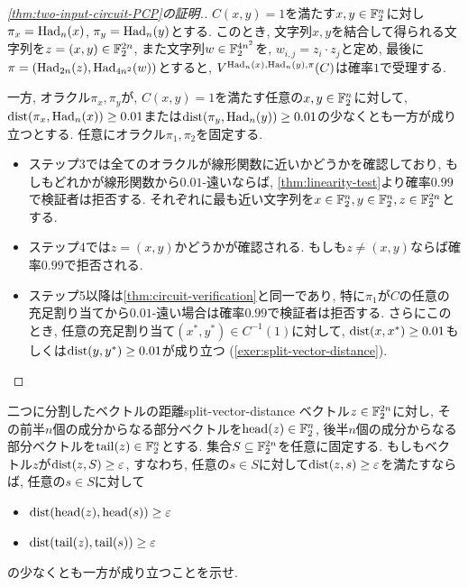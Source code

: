 \begin{proof}[\cref{thm:two-input-circuit-PCP}の証明.]
$C(x,y)=1$を満たす$x,y\in\mathbb{F}_2^n$に対し$\pi_x=\mathrm{Had}_n(x)$, $\pi_y=\mathrm{Had}_n(y)$とする.
このとき, 文字列$x,y$を結合して得られる文字列を$z=(x,y)\in\mathbb{F}_2^{2n}$,
また文字列$w\in\mathbb{F}_2^{4n^2}$を, $w_{i,j}=z_i\cdot z_j$と定め, 最後に
$\pi = \qty( \mathrm{Had}_{2n}(z), \mathrm{Had}_{4n^2}(w) )$とすると,
$V^{\mathrm{Had}_n(x),\mathrm{Had}_n(y),\pi}(C)$は確率$1$で受理する.

一方, オラクル$\pi_x,\pi_y$が, $C(x,y)=1$を満たす任意の$x,y\in\mathbb{F}_2^n$に対して, $\mathrm{dist}(\pi_x,\mathrm{Had}_n(x))\ge 0.01$または$\mathrm{dist}(\pi_y,\mathrm{Had}_n(y))\ge0.01$の少なくとも一方が成り立つとする.
任意にオラクル$\pi_1,\pi_2$を固定する.
\begin{itemize}
  \item ステップ3では全てのオラクルが線形関数に近いかどうかを確認しており, もしもどれかが線形関数から$0.01$-遠いならば, \cref{thm:linearity-test}より確率$0.99$で検証者は拒否する. それぞれに最も近い文字列を$x\in\mathbb{F}_2^n,y\in\mathbb{F}_2^n,z\in\mathbb{F}_2^{2n}$とする.
  \item ステップ4では$z=(x,y)$かどうかが確認される. もしも$z\ne(x,y)$ならば確率$0.99$で拒否される.
  \item ステップ5以降は\cref{thm:circuit-verification}と同一であり, 特に$\pi_1$が$C$の任意の充足割り当てから$0.01$-遠い場合は確率$0.99$で検証者は拒否する. さらにこのとき, 任意の充足割り当て$(x^*,y^*)\in C^{-1}(1)$に対して, $\mathrm{dist}(x,x^*)\ge0.01$もしくは$\mathrm{dist}(y,y^*)\ge 0.01$が成り立つ (\cref{exer:split-vector-distance}).
\end{itemize}
\end{proof}

\begin{exercise}{二つに分割したベクトルの距離}{split-vector-distance}
  ベクトル$z\in\mathbb{F}_2^{2n}$に対し, その前半$n$個の成分からなる部分ベクトルを$\mathrm{head}(z)\in\mathbb{F}_2^n$, 後半$n$個の成分からなる部分ベクトルを$\mathrm{tail}(z)\in\mathbb{F}_2^n$とする.
  集合$S\subseteq\mathbb{F}_2^{2n}$を任意に固定する.
  もしもベクトル$z$が$\mathrm{dist}(z,S)\ge \varepsilon$, すなわち, 任意の$s\in S$に対して$\mathrm{dist}(z,s)\ge \varepsilon$を満たすならば,
  任意の$s\in S$に対して
  \begin{itemize}
  \item $\mathrm{dist}(\mathrm{head}(z),\mathrm{head}(s))\ge \varepsilon$
  \item $\mathrm{dist}(\mathrm{tail}(z),\mathrm{tail}(s))\ge \varepsilon$
  \end{itemize}
  の少なくとも一方が成り立つことを示せ.
\end{exercise}